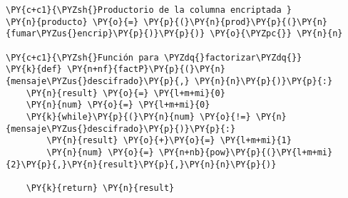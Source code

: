 
\begin{Verbatim}[commandchars=\\\{\}]
\PY{c+c1}{\PYZsh{}Productorio de la columna encriptada }
\PY{n}{producto} \PY{o}{=} \PY{p}{(}\PY{n}{prod}\PY{p}{(}\PY{n}{fumar\PYZus{}encrip}\PY{p}{)}\PY{p}{)} \PY{o}{\PYZpc{}} \PY{n}{n}

\PY{c+c1}{\PYZsh{}Función para \PYZdq{}factorizar\PYZdq{}}
\PY{k}{def} \PY{n+nf}{factP}\PY{p}{(}\PY{n}{mensaje\PYZus{}descifrado}\PY{p}{,} \PY{n}{n}\PY{p}{)}\PY{p}{:}     
    \PY{n}{result} \PY{o}{=} \PY{l+m+mi}{0}
    \PY{n}{num} \PY{o}{=} \PY{l+m+mi}{0}
    \PY{k}{while}\PY{p}{(}\PY{n}{num} \PY{o}{!=} \PY{n}{mensaje\PYZus{}descifrado}\PY{p}{)}\PY{p}{:} 
        \PY{n}{result} \PY{o}{+}\PY{o}{=} \PY{l+m+mi}{1}
        \PY{n}{num} \PY{o}{=} \PY{n+nb}{pow}\PY{p}{(}\PY{l+m+mi}{2}\PY{p}{,}\PY{n}{result}\PY{p}{,}\PY{n}{n}\PY{p}{)}
        
    \PY{k}{return} \PY{n}{result}
\end{Verbatim}